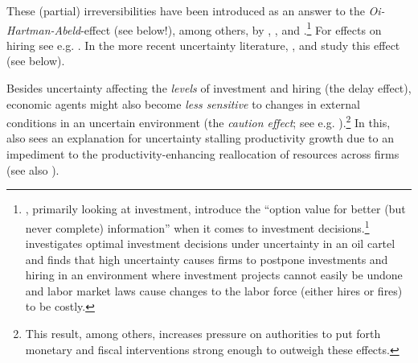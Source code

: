 \documentclass[a4paper,11pt,listof=nochaptergap,oneside,pointednumbers,bibtotoc,bigheadings,liststotoc]{scrbook}
\begin{document}
These (partial) irreversibilities have been introduced as an answer to the \textit{Oi-Hartman-Abeld}-effect (see below!), among others, by \citet{dixitandpindyck:94}, \citet{bernanke:83}, \citet{abelandeberly:96} and \citet{siegel:86}.\footnote{\citet{dixitandpindyck:94}, primarily looking at investment, introduce the ``option value for better (but never complete) information'' when it comes to investment decisions.\footnote{In fact, the term 'options-effect' in this context borrows from an analogy of option theory in finance.} \citet{bernanke:83} investigates optimal investment decisions under uncertainty in an oil cartel and finds that high uncertainty causes firms to postpone investments and hiring in an environment where investment projects cannot easily be undone and labor market laws cause changes to the labor force (either hires or fires) to be costly.} For effects on hiring see e.g. \citet{bentoliliaandbertola:90}. In the more recent uncertainty literature, \citet{bloom:09}, \citet{bloometal:12} and \citet{schaal:17} study this effect (see below).

Besides uncertainty affecting the \textit{levels} of investment and hiring (the delay effect), economic agents might also become \textit{less sensitive} to changes in external conditions in an uncertain environment (the \textit{caution effect}; see e.g. \citealp{bloom:09}).\footnote{This result, among others, increases pressure on authorities to put forth monetary and fiscal interventions strong enough to outweigh these effects.} In this, \citet{bloom:14} also sees an explanation for uncertainty stalling productivity growth due to an impediment to the productivity-enhancing reallocation of resources across firms (see also \citealp{bloometal:12}).\\
\end{document}

